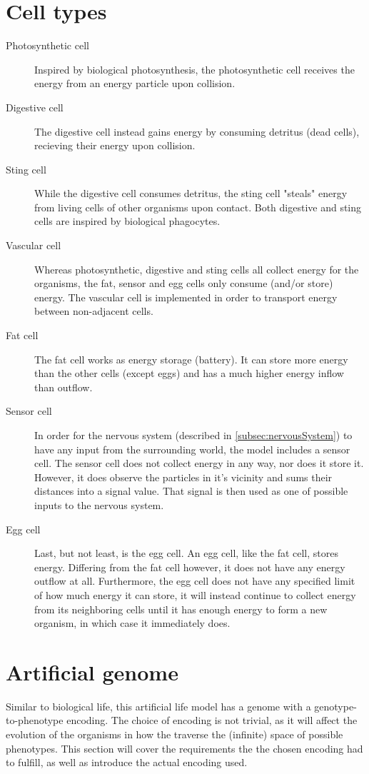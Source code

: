\section{Cell types}
\begin{description}
    \item [Photosynthetic cell] Inspired by biological photosynthesis, the photosynthetic cell receives the energy from an energy particle upon collision.
    \item [Digestive cell] %
    The digestive cell instead gains energy by consuming detritus (dead cells), recieving their energy upon collision.
    \item [Sting cell] %
    While the digestive cell consumes detritus, the sting cell "steals" energy from living cells of other organisms upon contact. Both digestive and sting cells are inspired by biological phagocytes.
    \item [Vascular cell] Whereas photosynthetic, digestive and sting cells all collect energy for the organisms, the fat, sensor and egg cells only consume (and/or store) energy. The vascular cell is implemented in order to transport energy between non-adjacent cells.
    \item [Fat cell] The fat cell works as energy storage (battery). It can store more energy than the other cells (except eggs) and has a much higher energy inflow than outflow.
    \item [Sensor cell] In order for the nervous system (described in \ref{subsec:nervousSystem}) to have any input from the surrounding world, the model includes a sensor cell. The sensor cell does not collect energy in any way, nor does it store it. However, it does observe the particles in it's vicinity and sums their distances into a signal value. That signal is then used as one of possible inputs to the nervous system.
    \item [Egg cell] Last, but not least, is the egg cell. An egg cell, like the fat cell, stores energy. Differing from the fat cell however, it does not have any energy outflow at all. Furthermore, the egg cell does not have any specified limit of how much energy it can store, it will instead continue to collect energy from its neighboring cells until it has enough energy to form a new organism, in which case it immediately does.
\end{description}

\section{Artificial genome}
Similar to biological life, this artificial life model has a genome with a genotype-to-phenotype encoding. The choice of encoding is not trivial, as it will affect the evolution of the organisms in how the traverse the (infinite) space of possible phenotypes. This section will cover the requirements the the chosen encoding had to fulfill, as well as introduce the actual encoding used.
